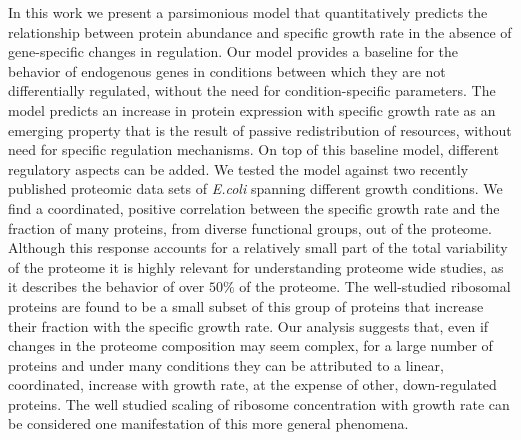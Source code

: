 In this work we present a parsimonious model that quantitatively predicts the relationship between protein abundance and specific growth rate in the absence of gene-specific changes in regulation.
Our model provides a baseline for the behavior of endogenous genes in conditions between which they are not differentially regulated, without the need for condition-specific parameters.
The model predicts an increase in protein expression with specific growth rate as an emerging property that is the result of passive redistribution of resources, without need for specific regulation mechanisms.
On top of this baseline model, different regulatory aspects can be added.
We tested the model against two recently published proteomic data sets of \emph{E.coli} spanning different growth conditions\cite{Peebo_2015,Heinemann2015}.
We find a coordinated, positive correlation between the specific growth rate and the fraction of many proteins, from diverse functional groups, out of the proteome.
Although this response accounts for a relatively small part of the total variability of the proteome it is highly relevant for understanding proteome wide studies, as it describes the behavior of over $50\%$ of the proteome.
The well-studied ribosomal proteins are found to be a small subset of this group of proteins that increase their fraction with the specific growth rate.
Our analysis suggests that, even if changes in the proteome composition may seem complex, for a large number of proteins and under many conditions they can be attributed to a linear, coordinated, increase with growth rate, at the expense of other, down-regulated proteins.
The well studied scaling of ribosome concentration with growth rate can be considered one manifestation of this more general phenomena.